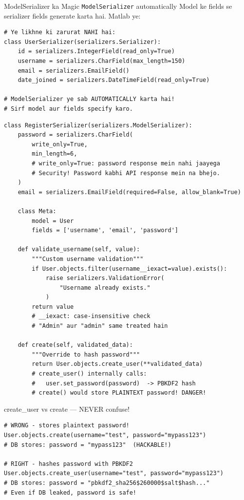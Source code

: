 \documentclass[11pt,a4paper,twoside]{report}
\begin{document}
\begin{hindibox}{ModelSerializer ka Magic}
\texttt{ModelSerializer} automatically Model ke fields se serializer fields generate karta hai. Matlab ye:
\begin{lstlisting}[style=pythonstyle]
# Ye likhne ki zarurat NAHI hai:
class UserSerializer(serializers.Serializer):
    id = serializers.IntegerField(read_only=True)
    username = serializers.CharField(max_length=150)
    email = serializers.EmailField()
    date_joined = serializers.DateTimeField(read_only=True)

# ModelSerializer ye sab AUTOMATICALLY karta hai!
# Sirf model aur fields specify karo.
\end{lstlisting}
\end{hindibox}

\begin{lstlisting}[style=pythonstyle,caption={serializers.py --- RegisterSerializer with Validation}]
class RegisterSerializer(serializers.ModelSerializer):
    password = serializers.CharField(
        write_only=True,
        min_length=6,
        # write_only=True: password response mein nahi jaayega
        # Security! Password kabhi API response mein na bhejo.
    )
    email = serializers.EmailField(required=False, allow_blank=True)

    class Meta:
        model = User
        fields = ['username', 'email', 'password']

    def validate_username(self, value):
        """Custom username validation"""
        if User.objects.filter(username__iexact=value).exists():
            raise serializers.ValidationError(
                "Username already exists."
            )
        return value
        # __iexact: case-insensitive check
        # "Admin" aur "admin" same treated hain

    def create(self, validated_data):
        """Override to hash password"""
        return User.objects.create_user(**validated_data)
        # create_user() internally calls:
        #   user.set_password(password)  -> PBKDF2 hash
        # create() would store PLAINTEXT password! DANGER!
\end{lstlisting}

\begin{dangerbox}{create\_user vs create --- NEVER confuse!}
\begin{lstlisting}[style=pythonstyle]
# WRONG - stores plaintext password!
User.objects.create(username="test", password="mypass123")
# DB stores: password = "mypass123"  (HACKABLE!)

# RIGHT - hashes password with PBKDF2
User.objects.create_user(username="test", password="mypass123")
# DB stores: password = "pbkdf2_sha256$260000$salt$hash..."
# Even if DB leaked, password is safe!
\end{lstlisting}
\end{dangerbox}
\end{document}
